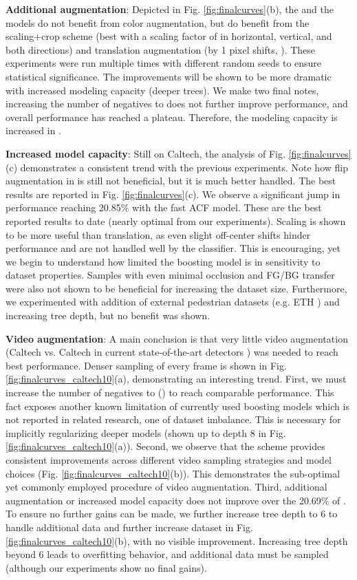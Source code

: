 \documentclass[a4paper,conference]{IEEEtran_icpr}
\begin{document}
\textbf{Additional augmentation}: Depicted in Fig. \ref{fig:finalcurves}(b), the  and the  models do not benefit from color augmentation, but do benefit from the scaling+crop scheme (best with a scaling factor of  in horizontal, vertical, and both directions) and translation augmentation (by 1 pixel shifts, ). These experiments were run multiple times with different random seeds to ensure statistical significance. The improvements will be shown to be more dramatic with increased modeling capacity (deeper trees). We make two final notes, increasing the number of negatives to  does not further improve performance, and overall performance has reached a plateau. Therefore, the modeling capacity is increased in . 

\textbf{Increased model capacity}: Still on Caltech, the analysis of Fig. \ref{fig:finalcurves}(c) demonstrates a consistent trend with the previous experiments. Note how flip augmentation in  is still not beneficial, but it is much better handled. The best results are reported in Fig. \ref{fig:finalcurves}(c). We observe a significant jump in performance reaching 20.85\% with the fast ACF model. These are the best reported results to date (nearly optimal from our experiments). Scaling is shown to be more useful than translation, as even slight off-center shifts hinder performance and are not handled well by the classifier. This is encouraging, yet we begin to understand how limited the boosting model is in sensitivity to dataset properties. Samples with even minimal occlusion and FG/BG transfer were also not shown to be beneficial for increasing the dataset size. Furthermore, we experimented with addition of external pedestrian datasets (e.g. ETH \cite{eth}) and increasing tree depth, but no benefit was shown.  

  \textbf{Video augmentation}: A main conclusion is that very little video augmentation (Caltech vs. Caltech in current state-of-the-art detectors \cite{checkerboard,ccf,ldcf}) was needed to reach best performance. Denser sampling of every  frame is shown in Fig. \ref{fig:finalcurves_caltech10}(a), demonstrating an interesting trend. First, we must increase the number of negatives to  () to reach comparable performance. This fact exposes another known limitation of currently used boosting models which is not reported in related research, one of dataset imbalance. This is necessary for implicitly regularizing deeper models (shown up to depth 8 in Fig. \ref{fig:finalcurves_caltech10}(a)). Second, we observe that the  scheme provides consistent improvements across different video sampling strategies and model choices (Fig. \ref{fig:finalcurves_caltech10}(b)). This demonstrates the sub-optimal yet commonly employed procedure of video augmentation. Third, additional augmentation or increased model capacity does not improve over the 20.69\% of . To ensure no further gains can be made, we further increase tree depth to 6 to handle additional data and further increase dataset in Fig. \ref{fig:finalcurves_caltech10}(b), with no visible improvement. Increasing tree depth beyond 6 leads to overfitting behavior, and additional data must be sampled (although our experiments show no final gains).
  
\end{document}
